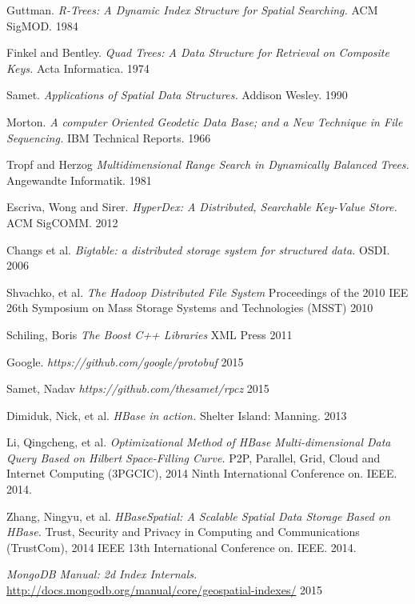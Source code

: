 \documentclass[11pt]{article}
\begin{document}
\begin{thebibliography}{99}

  Guttman.
  \emph{R-Trees: A Dynamic Index Structure for Spatial Searching.}
  ACM SigMOD.
  1984

  Finkel and Bentley.
  \emph{Quad Trees: A Data Structure for Retrieval on Composite Keys.}
  Acta Informatica.
  1974

  Samet.
  \emph{Applications of Spatial Data Structures.}
  Addison Wesley.
  1990

  Morton.
  \emph{A computer Oriented Geodetic Data Base; and a New Technique in File Sequencing.}
  IBM Technical Reports. 
  1966

 Tropf and Herzog
 \emph{Multidimensional Range Search in Dynamically Balanced Trees.}
 Angewandte Informatik.
 1981

  Escriva, Wong and Sirer.
  \emph{HyperDex: A Distributed, Searchable Key-Value Store.}
  ACM SigCOMM.
  2012

  Changs et al.
  \emph{Bigtable: a distributed storage system for structured data.}
  OSDI.
  2006

Shvachko, et al.
\emph{The Hadoop Distributed File System}
Proceedings of the 2010 IEE 26th Symposium on Mass Storage Systems and Technologies (MSST)
2010

Schiling, Boris
\emph{The Boost C++ Libraries}
XML Press
2011

Google.
\emph{https://github.com/google/protobuf}
2015

Samet, Nadav
\emph{https://github.com/thesamet/rpcz}
2015

  Dimiduk, Nick, et al.
  \emph{HBase in action.}
   Shelter Island: Manning.
   2013

  Li, Qingcheng, et al.
  \emph{Optimizational Method of HBase Multi-dimensional Data Query Based on Hilbert Space-Filling Curve.}
   P2P, Parallel, Grid, Cloud and Internet Computing (3PGCIC), 2014 Ninth International Conference on. IEEE.
   2014.

  Zhang, Ningyu, et al. 
  \emph{HBaseSpatial: A Scalable Spatial Data Storage Based on HBase.}
   Trust, Security and Privacy in Computing and Communications (TrustCom), 2014 IEEE 13th International Conference on. IEEE.
   2014. 
   
  \emph{MongoDB Manual: 2d Index Internals.}
  \url{http://docs.mongodb.org/manual/core/geospatial-indexes/}
  2015



\end{thebibliography}
\end{document}

